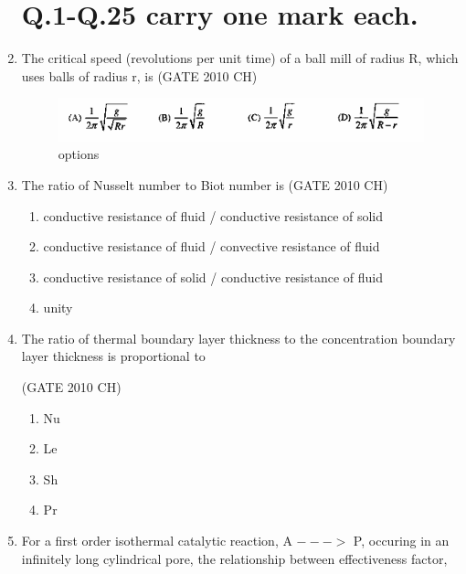 \documentclass[journal,12pt,onecolumn]{exam}
\theoremstyle{remark}
\begin{document}
\begin{enumerate}
    

 \section{Q.1-Q.25 carry one mark each.}

\item 
    The critical speed (revolutions per unit time) of a ball mill of radius R, which uses balls of radius r, is 
\hfill{(GATE 2010 CH)}\\

\begin{figure}[htbp]
    \centering
    \includegraphics[width=1\columnwidth]{figs/Q.1 options.png}
    \caption{options}
    \label{fig:figs/Q.1 options.png}
\end{figure}
  

\item 
   The ratio of Nusselt number to Biot number is
   \hfill{(GATE 2010 CH)}\\
\begin{enumerate}
    \item conductive resistance of fluid / conductive resistance of solid
    \item conductive resistance of fluid / convective resistance of fluid
    \item conductive resistance of solid / conductive resistance of fluid 
    \item unity
\end{enumerate}
\item
  The ratio of thermal boundary layer thickness to the concentration boundary layer thickness is proportional to
  
  \hfill{(GATE 2010 CH)}\\
  
\begin{enumerate}
  \item Nu
  \item Le
  \item Sh
  \item Pr
\end{enumerate}
 \item 
  For a first order isothermal catalytic reaction, A $--->$ P, occuring in an infinitely long cylindrical pore, the relationship between effectiveness factor,
  

\end{enumerate}
\end{document}
